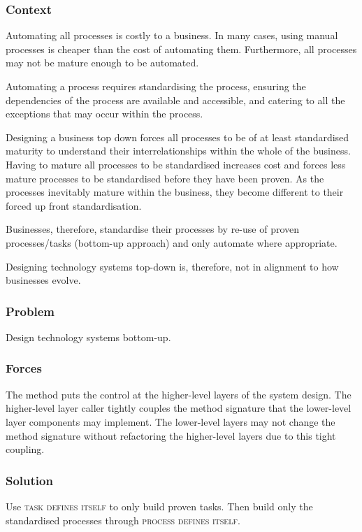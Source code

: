\documentclass[prodmode]{style/acmlarge}
\begin{document}
\subsubsection*{Context} Automating all processes is costly to a business.  In
many cases, using manual processes is cheaper than the cost of automating them.
 Furthermore, all processes may not be mature enough to be automated.
 
Automating a process requires standardising the process, ensuring the
dependencies of the process are available and accessible, and catering to all the
exceptions that may occur within the process.

Designing a business top down forces all processes to be of at least
standardised maturity to understand their interrelationships within the whole of
the business.  Having to mature all processes to be standardised increases cost
and forces less mature processes to be standardised before they have been
proven.  As the processes inevitably mature within the business, they become
different to their forced up front standardisation.

Businesses, therefore, standardise their processes by re-use of proven
processes/tasks (bottom-up approach) and only automate where appropriate.

Designing technology systems top-down is, therefore, not in alignment to how
businesses evolve.

\subsubsection*{Problem} Design technology systems bottom-up.

\subsubsection*{Forces} The method puts the control at the higher-level layers
of the system design.  The higher-level layer caller tightly couples the method
signature that the lower-level layer components may implement.  The lower-level
layers may not change the method signature without refactoring the higher-level
layers due to this tight coupling.

\subsubsection*{Solution} Use \textsc{task defines itself} to only build proven
tasks.  Then build only the standardised processes through \textsc{process
defines itself}.
\end{document}
